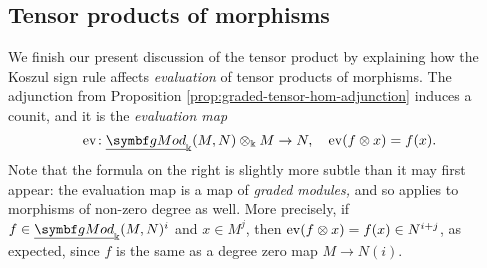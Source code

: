 \subsection{Tensor products of morphisms}
We finish our present discussion of the tensor product by explaining how the Koszul sign rule affects \emph{evaluation} of tensor products of morphisms.
The adjunction from Proposition \ref{prop:graded-tensor-hom-adjunction} induces a counit, and it is the \emph{evaluation map}
\[ \ev\!:\ugMod_{\Bbbk}(M,N)\otimes_\Bbbk M \to N,\quad \ev(f\otimes x) = f(x). \]
Note that the formula on the right is slightly more subtle than it may first appear: the evaluation map is a map of \emph{graded modules,} and so
applies to morphisms of non-zero degree as well. More precisely, if \(f\in\ugMod_\Bbbk(M,N)^i\) and \(x\in M^j\), then \(\operatorname{ev}(f\otimes x) = f(x)\in N^{i+j}\),
as expected, since \(f\) is the same as a degree zero map \(M \to N(i)\).

